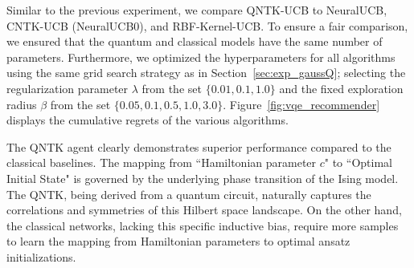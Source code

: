 \documentclass[pdflatex,sn-mathphys-num]{sn-jnl}%
\theoremstyle{thmstyleone}%
\theoremstyle{thmstyletwo}%
\theoremstyle{thmstylethree}%
\begin{document}

Similar  to  the previous experiment, we compare QNTK-UCB to NeuralUCB, CNTK-UCB (NeuralUCB0), and RBF-Kernel-UCB. To ensure a fair comparison, we ensured that the quantum and classical models have  the same number of parameters. Furthermore, we optimized the hyperparameters for all algorithms using the same grid search strategy as in Section~\ref{sec:exp_gaussQ};  selecting the regularization parameter $\lambda$ from the set $\{0.01,0.1,1.0\}$ and the fixed exploration radius $\beta$ from the set $\{0.05, 0.1, 0.5, 1.0, 3.0\}$. Figure~\ref{fig:vqe_recommender} displays the cumulative regrets of the various algorithms.

The QNTK agent clearly demonstrates superior performance compared to the classical baselines. The mapping from ``Hamiltonian parameter $c$" to ``Optimal Initial State" is governed by the underlying phase transition of the Ising model. The QNTK, being derived from a quantum circuit, naturally captures the correlations and symmetries of this Hilbert space landscape. On the other hand, the classical networks, lacking this specific inductive bias, require more samples to learn the mapping from Hamiltonian parameters to optimal ansatz initializations.
\end{document}
